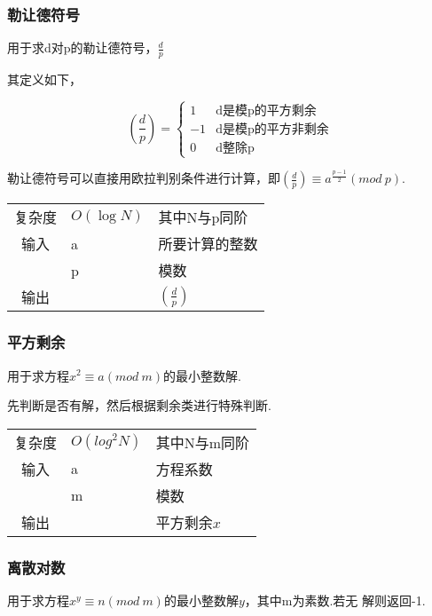         \subsubsection{勒让德符号}\small
用于求d对p的勒让德符号，$\frac{d}{p}$

其定义如下，

\[ (\frac{d}{p}) = 
\begin{cases}
 1 & \text{d是模p的平方剩余} \\
 -1 & \text{d是模p的平方非剩余} \\
 0 & \text{d整除p}
\end{cases} \]

勒让德符号可以直接用欧拉判别条件进行计算，即$(\frac{d}{p}) \equiv a ^ {\frac{p-1}{2}}(mod\ p)$.

\begin{longtable}{|c|l|l|}
复杂度 & $O(\log N)$ & 其中N与p同阶  \\
输入 & a & 所要计算的整数 \\
 & p & 模数 \\
输出 &  & $(\frac{d}{p})$ \\
\end{longtable}



        \subsubsection{平方剩余}\small
用于求方程$x^{2} \equiv a(mod\ m)$的最小整数解.

先判断是否有解，然后根据剩余类进行特殊判断.
\begin{longtable}{|c|l|l|}
复杂度 & $O(log^{2}N)$ & 其中N与m同阶  \\
输入 & a & 方程系数 \\
 & m & 模数 \\
输出 &  & 平方剩余$x$ \\
\end{longtable}



        \subsubsection{离散对数}\small
用于求方程$x^{y} \equiv n(mod\ m)$的最小整数解$y$，其中m为素数.若无
解则返回-1.

